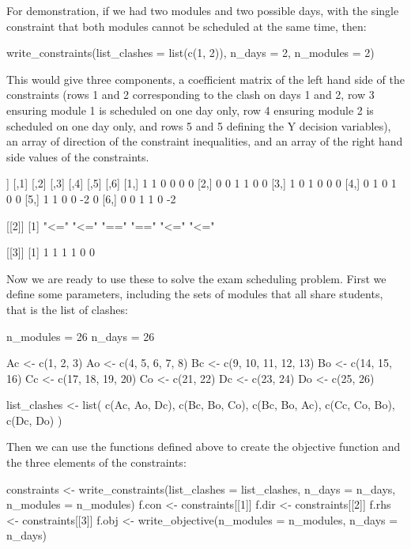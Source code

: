 For demonstration, if we had two modules and two possible days, with the single constraint that both modules cannot be scheduled at the same time, then:

\begin{Rin}
write_constraints(list_clashes = list(c(1, 2)),
                  n_days = 2,
                  n_modules = 2)
\end{Rin}

This would give three components, a coefficient matrix of the left hand side of the constraints (rows 1 and 2 corresponding to the clash on days 1 and 2, row 3 ensuring module 1 is scheduled on one day only, row 4 ensuring module 2 is scheduled on one day only, and rows 5 and 5 defining the Y decision variables), an array of direction of the constraint inequalities, and an array of the right hand side values of the constraints.

\begin{Rout}
[[1]]
     [,1] [,2] [,3] [,4] [,5] [,6]
[1,]    1    1    0    0    0    0
[2,]    0    0    1    1    0    0
[3,]    1    0    1    0    0    0
[4,]    0    1    0    1    0    0
[5,]    1    1    0    0   -2    0
[6,]    0    0    1    1    0   -2

[[2]]
[1] "<=" "<=" "==" "==" "<=" "<="

[[3]]
[1] 1 1 1 1 0 0
\end{Rout}

Now we are ready to use these to solve the exam scheduling problem.
First we define some parameters, including the sets of modules that all share students, that is the list of clashes:

\begin{Rin}
n_modules = 26
n_days = 26

Ac <- c(1, 2, 3)
Ao <- c(4, 5, 6, 7, 8)
Bc <- c(9, 10, 11, 12, 13)
Bo <- c(14, 15, 16)
Cc <- c(17, 18, 19, 20)
Co <- c(21, 22)
Dc <- c(23, 24)
Do <- c(25, 26)

list_clashes <- list(
  c(Ac, Ao, Dc),
  c(Bc, Bo, Co),
  c(Bc, Bo, Ac),
  c(Cc, Co, Bo),
  c(Dc, Do)
)
\end{Rin}

Then we can use the functions defined above to create the objective function and the three elements of the constraints:

\begin{Rin}
constraints <- write_constraints(list_clashes = list_clashes,
                                 n_days = n_days,
                                 n_modules = n_modules)
f.con <- constraints[[1]]
f.dir <- constraints[[2]]
f.rhs <- constraints[[3]]
f.obj <- write_objective(n_modules = n_modules, n_days = n_days)
\end{Rin}

